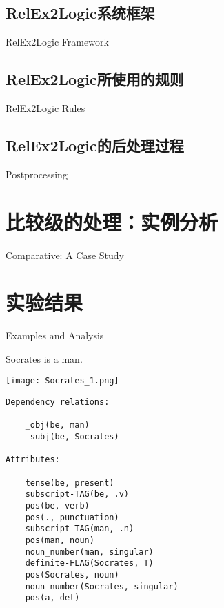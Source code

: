 \subsection{RelEx2Logic系统框架}{RelEx2Logic Framework}


\subsection{RelEx2Logic所使用的规则}{RelEx2Logic Rules}


\subsection{RelEx2Logic的后处理过程}{Postprocessing}


\section{比较级的处理：实例分析}{Comparative: A Case Study}  

\section{实验结果}{Examples and Analysis}  

Socrates is a man.

\texttt{[image: Socrates\_1.png]}

\begin{verbatim}
Dependency relations:

    _obj(be, man)
    _subj(be, Socrates)

Attributes:

    tense(be, present)
    subscript-TAG(be, .v)
    pos(be, verb)
    pos(., punctuation)
    subscript-TAG(man, .n)
    pos(man, noun)
    noun_number(man, singular)
    definite-FLAG(Socrates, T)
    pos(Socrates, noun)
    noun_number(Socrates, singular)
    pos(a, det)

\end{verbatim}


